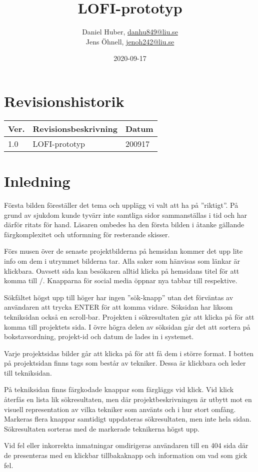 \documentclass{TDP003mall}
\author{Daniel Huber, \url{danhu849@liu.se}\\
  Jens Öhnell, \url{jenoh242@liu.se}}
\title{LOFI-prototyp}
\date{2020-09-17}
\begin{document}
\projectpage
\section{Revisionshistorik}
\begin{table}[!h]
\begin{tabularx}{\linewidth}{|l|X|l|}
\hline
Ver. & Revisionsbeskrivning & Datum \\\hline
1.0 & LOFI-prototyp & 200917 \\\hline
\end{tabularx}
\end{table}

\section{Inledning}
Första bilden föreställer det tema och upplägg vi valt att ha på ''riktigt''. På grund av sjukdom kunde tyvärr inte samtliga sidor sammanställas i tid och har därför ritats för hand. Läsaren ombedes ha den första bilden i åtanke gällande färgkomplexitet och utformning för resterande skisser.

Förs musen över de senaste projektbilderna på hemsidan kommer det upp lite info om dem i utrymmet bilderna tar. Alla saker som hänvisas som länkar är klickbara. Oavsett sida kan besökaren alltid klicka på hemsidans titel för att komma till /. Knapparna för social media öppnar nya tabbar till respektive.

Sökfältet högst upp till höger har ingen ''sök-knapp'' utan det förväntas av användaren att trycka ENTER för att komma vidare. Söksidan har liksom tekniksidan också en scroll-bar. Projekten i sökresultaten går att klicka på för att komma till projektets sida. I övre högra delen av söksidan går det att sortera på bokstavsordning, projekt-id och datum de lades in i systemet.

Varje projektsidas bilder går att klicka på för att få dem i större format. I botten på projektsidan finns tags som består av tekniker. Dessa är klickbara och leder till tekniksidan.

På tekniksidan finns färgkodade knappar som färgläggs vid klick. Vid klick återfås en lista lik sökresultaten, men där projektbeskrivningen är utbytt mot en visuell representation av vilka tekniker som använts och i hur stort omfång. Markeras flera knappar samtidigt uppdateras sökresultaten, men inte hela sidan. Sökresultaten sorteras med de markerade teknikerna högst upp.

Vid fel eller inkorrekta inmatningar omdirigeras användaren till en 404 sida där de presenteras med en klickbar tillbakaknapp och information om vad som gick fel.
\end{document}
